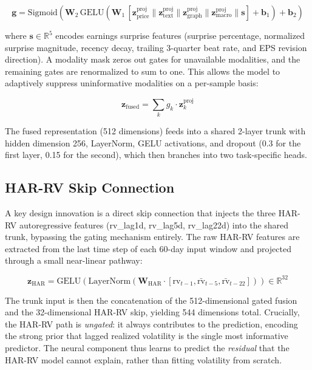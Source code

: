 \documentclass[12pt, a4paper]{article}
\begin{document}
\begin{equation}
    \mathbf{g} = \text{Sigmoid}\!\left( \mathbf{W}_2 \, \text{GELU}\!\left(\mathbf{W}_1 \,[\mathbf{z}_{\text{price}}^{\text{proj}} \| \mathbf{z}_{\text{text}}^{\text{proj}} \| \mathbf{z}_{\text{graph}}^{\text{proj}} \| \mathbf{z}_{\text{macro}}^{\text{proj}} \| \mathbf{s}] + \mathbf{b}_1\right) + \mathbf{b}_2 \right)
\end{equation}

where $\mathbf{s} \in \mathbb{R}^5$ encodes earnings surprise features (surprise percentage, normalized surprise magnitude, recency decay, trailing 3-quarter beat rate, and EPS revision direction). A modality mask zeros out gates for unavailable modalities, and the remaining gates are renormalized to sum to one. This allows the model to adaptively suppress uninformative modalities on a per-sample basis:

\begin{equation}
    \mathbf{z}_{\text{fused}} = \sum_{k} g_k \cdot \mathbf{z}_k^{\text{proj}}
\end{equation}

The fused representation (512 dimensions) feeds into a shared 2-layer trunk with hidden dimension 256, LayerNorm, GELU activations, and dropout (0.3 for the first layer, 0.15 for the second), which then branches into two task-specific heads.

\subsection{HAR-RV Skip Connection}

A key design innovation is a direct skip connection that injects the three HAR-RV autoregressive features (rv\_lag1d, rv\_lag5d, rv\_lag22d) into the shared trunk, bypassing the gating mechanism entirely. The raw HAR-RV features are extracted from the last time step of each 60-day input window and projected through a small near-linear pathway:

\begin{equation}
    \mathbf{z}_{\text{HAR}} = \text{GELU}\!\left(\text{LayerNorm}\!\left(\mathbf{W}_{\text{HAR}} \cdot [\text{rv}_{t-1}, \bar{\text{rv}}_{t-5}, \bar{\text{rv}}_{t-22}]\right)\right) \in \mathbb{R}^{32}
\end{equation}

The trunk input is then the concatenation of the 512-dimensional gated fusion and the 32-dimensional HAR-RV skip, yielding 544 dimensions total. Crucially, the HAR-RV path is \textit{ungated}: it always contributes to the prediction, encoding the strong prior that lagged realized volatility is the single most informative predictor. The neural component thus learns to predict the \textit{residual} that the HAR-RV model cannot explain, rather than fitting volatility from scratch.
\end{document}
